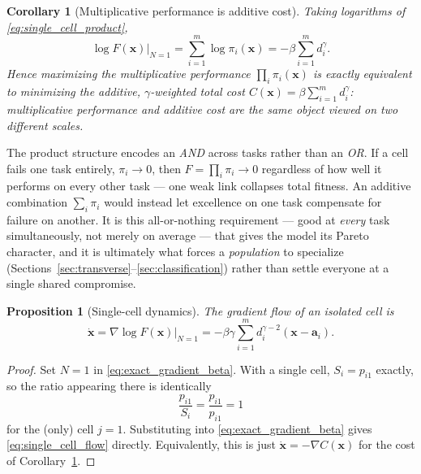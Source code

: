 \documentclass[11pt,a4paper]{article}
\theoremstyle{plain}
\newtheorem{proposition}[theorem]{Proposition}
\newtheorem{corollary}[theorem]{Corollary}
\theoremstyle{definition}
\theoremstyle{remark}
\newcommand{\bx}{\bm{x}}
\newcommand{\ba}{\bm{a}}
\newcommand{\bw}{\beta}
\begin{document}
\begin{corollary}[Multiplicative performance is additive cost]
\label{cor:additive_cost}
Taking logarithms of \eqref{eq:single_cell_product},
\begin{equation}
  \boxed{
  \log F(\bx)\Big|_{N=1}=\sum_{i=1}^{m}\log\pi_i(\bx)=-\bw\sum_{i=1}^{m}d_i^{\gamma}.
  }
  \label{eq:additive_cost}
\end{equation}
Hence maximizing the multiplicative performance $\prod_i\pi_i(\bx)$ is
exactly equivalent to minimizing the additive, $\gamma$-weighted total cost
$C(\bx)=\bw\sum_{i=1}^m d_i^{\gamma}$: multiplicative performance and
additive cost are the same object viewed on two different scales.
\end{corollary}

\begin{warningbox}
The product structure encodes an \emph{AND} across tasks rather than an
\emph{OR}. If a cell fails one task entirely, $\pi_i\to0$, then
$F=\prod_i\pi_i\to0$ regardless of how well it performs on every other
task — one weak link collapses total fitness. An additive combination
$\sum_i\pi_i$ would instead let excellence on one task compensate for
failure on another. It is this all-or-nothing requirement — good at
\emph{every} task simultaneously, not merely on average — that gives the
model its Pareto character, and it is ultimately what forces a
\emph{population} to specialize (Sections~\ref{sec:transverse}--\ref{sec:classification})
rather than settle everyone at a single shared compromise.
\end{warningbox}

\begin{proposition}[Single-cell dynamics]
\label{prop:single_cell_dynamics}
The gradient flow of an isolated cell is
\begin{equation}
  \boxed{
  \dot{\bx}=\nabla\log F(\bx)\Big|_{N=1}=-\bw\gamma\sum_{i=1}^{m}d_i^{\gamma-2}(\bx-\ba_i).
  }
  \label{eq:single_cell_flow}
\end{equation}
\end{proposition}
\begin{proof}
Set $N=1$ in \eqref{eq:exact_gradient_beta}. With a single cell, $S_i=p_{i1}$
exactly, so the ratio appearing there is identically
\[
  \frac{p_{i1}}{S_i}=\frac{p_{i1}}{p_{i1}}=1
\]
for the (only) cell $j=1$. Substituting into \eqref{eq:exact_gradient_beta}
gives \eqref{eq:single_cell_flow} directly. Equivalently, this is just
$\dot{\bx}=-\nabla C(\bx)$ for the cost of Corollary~\ref{cor:additive_cost}.
\end{proof}
\end{document}

